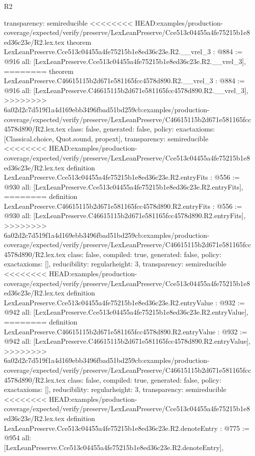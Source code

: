 \begin{lexlean}{R2}
\begin{coremodule}
{{{{{{{{{{{{{{{  transparency: semireducible
}
<<<<<<<< HEAD:examples/production-coverage/expected/verify/preserve/LexLeanPreserve/Cce513c04455a4fe75215b1e8ed36c23e/R2.lex.tex
theorem LexLeanPreserve.Cce513c04455a4fe75215b1e8ed36c23e.R2.__vrel_3 : @884 := @916 {
  all: [LexLeanPreserve.Cce513c04455a4fe75215b1e8ed36c23e.R2.__vrel_3],
========
theorem LexLeanPreserve.C46615115b2d671e581165fcc4578d890.R2.__vrel_3 : @884 := @916 {
  all: [LexLeanPreserve.C46615115b2d671e581165fcc4578d890.R2.__vrel_3],
>>>>>>>> 6a02d2c7d519f1a4d169ebb3496fbad51bd259cb:examples/production-coverage/expected/verify/preserve/LexLeanPreserve/C46615115b2d671e581165fcc4578d890/R2.lex.tex
  class: false,
  generated: false,
  policy: exact{axioms: [Classical.choice, Quot.sound, propext]},
  transparency: semireducible
}
<<<<<<<< HEAD:examples/production-coverage/expected/verify/preserve/LexLeanPreserve/Cce513c04455a4fe75215b1e8ed36c23e/R2.lex.tex
definition LexLeanPreserve.Cce513c04455a4fe75215b1e8ed36c23e.R2.entryFits : @556 := @930 {
  all: [LexLeanPreserve.Cce513c04455a4fe75215b1e8ed36c23e.R2.entryFits],
========
definition LexLeanPreserve.C46615115b2d671e581165fcc4578d890.R2.entryFits : @556 := @930 {
  all: [LexLeanPreserve.C46615115b2d671e581165fcc4578d890.R2.entryFits],
>>>>>>>> 6a02d2c7d519f1a4d169ebb3496fbad51bd259cb:examples/production-coverage/expected/verify/preserve/LexLeanPreserve/C46615115b2d671e581165fcc4578d890/R2.lex.tex
  class: false,
  compiled: true,
  generated: false,
  policy: exact{axioms: []},
  reducibility: regular{height: 3},
  transparency: semireducible
}
<<<<<<<< HEAD:examples/production-coverage/expected/verify/preserve/LexLeanPreserve/Cce513c04455a4fe75215b1e8ed36c23e/R2.lex.tex
definition LexLeanPreserve.Cce513c04455a4fe75215b1e8ed36c23e.R2.entryValue : @932 := @942 {
  all: [LexLeanPreserve.Cce513c04455a4fe75215b1e8ed36c23e.R2.entryValue],
========
definition LexLeanPreserve.C46615115b2d671e581165fcc4578d890.R2.entryValue : @932 := @942 {
  all: [LexLeanPreserve.C46615115b2d671e581165fcc4578d890.R2.entryValue],
>>>>>>>> 6a02d2c7d519f1a4d169ebb3496fbad51bd259cb:examples/production-coverage/expected/verify/preserve/LexLeanPreserve/C46615115b2d671e581165fcc4578d890/R2.lex.tex
  class: false,
  compiled: true,
  generated: false,
  policy: exact{axioms: []},
  reducibility: regular{height: 3},
  transparency: semireducible
}
<<<<<<<< HEAD:examples/production-coverage/expected/verify/preserve/LexLeanPreserve/Cce513c04455a4fe75215b1e8ed36c23e/R2.lex.tex
definition LexLeanPreserve.Cce513c04455a4fe75215b1e8ed36c23e.R2.denoteEntry : @775 := @954 {
  all: [LexLeanPreserve.Cce513c04455a4fe75215b1e8ed36c23e.R2.denoteEntry],
}}}}}}}}}}}}}}}}}}
\end{coremodule}
\end{lexlean}
